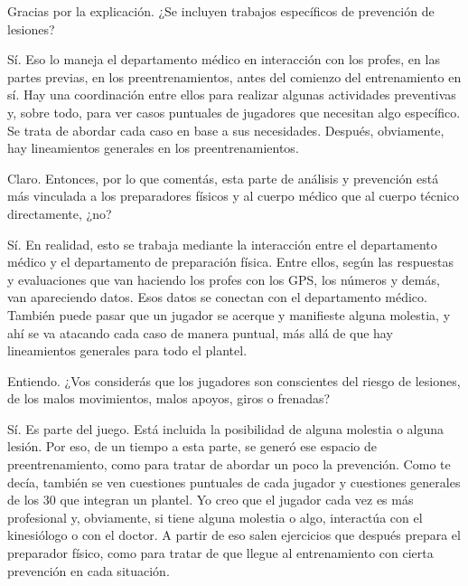 \begin{description}[leftmargin=0pt, itemindent=\parindent, labelsep=0.5em, itemsep=0pt, parsep=0pt, topsep=0pt]
    \item[\textbf{Entrevistador:}] Gracias por la explicación. ¿Se incluyen trabajos específicos de prevención de lesiones?

    \item[\textbf{Leonardo Lemos:}] Sí. Eso lo maneja el departamento médico en interacción con los profes, en las partes previas, en los preentrenamientos, antes del comienzo del entrenamiento en sí. Hay una coordinación entre ellos para realizar algunas actividades preventivas y, sobre todo, para ver casos puntuales de jugadores que necesitan algo específico. Se trata de abordar cada caso en base a sus necesidades. Después, obviamente, hay lineamientos generales en los preentrenamientos.

    \item[\textbf{Entrevistador:}] Claro. Entonces, por lo que comentás, esta parte de análisis y prevención está más vinculada a los preparadores físicos y al cuerpo médico que al cuerpo técnico directamente, ¿no?

    \item[\textbf{Leonardo Lemos:}] Sí. En realidad, esto se trabaja mediante la interacción entre el departamento médico y el departamento de preparación física. Entre ellos, según las respuestas y evaluaciones que van haciendo los profes con los GPS, los números y demás, van apareciendo datos. Esos datos se conectan con el departamento médico. También puede pasar que un jugador se acerque y manifieste alguna molestia, y ahí se va atacando cada caso de manera puntual, más allá de que hay lineamientos generales para todo el plantel.

    \item[\textbf{Entrevistador:}] Entiendo. ¿Vos considerás que los jugadores son conscientes del riesgo de lesiones, de los malos movimientos, malos apoyos, giros o frenadas?

    \item[\textbf{Leonardo Lemos:}] Sí. Es parte del juego. Está incluida la posibilidad de alguna molestia o alguna lesión. Por eso, de un tiempo a esta parte, se generó ese espacio de preentrenamiento, como para tratar de abordar un poco la prevención. Como te decía, también se ven cuestiones puntuales de cada jugador y cuestiones generales de los 30 que integran un plantel. Yo creo que el jugador cada vez es más profesional y, obviamente, si tiene alguna molestia o algo, interactúa con el kinesiólogo o con el doctor. A partir de eso salen ejercicios que después prepara el preparador físico, como para tratar de que llegue al entrenamiento con cierta prevención en cada situación.


\end{description}
